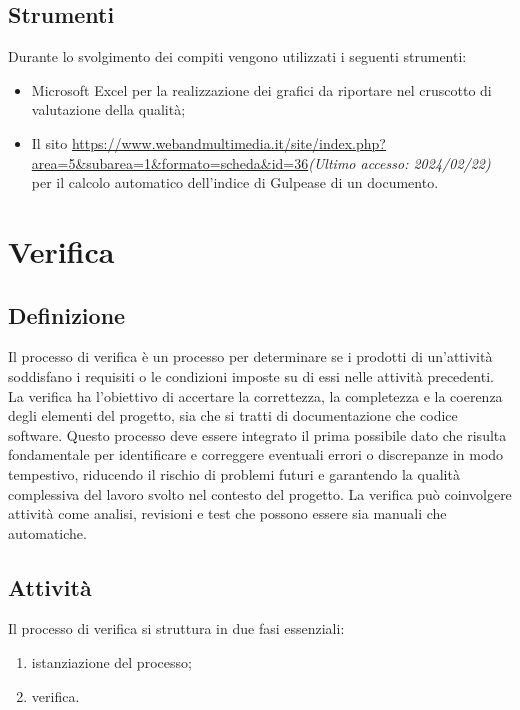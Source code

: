\subsection{Strumenti}
Durante lo svolgimento dei compiti vengono utilizzati i seguenti strumenti:
\begin{itemize}
    \item Microsoft Excel per la realizzazione dei grafici da riportare nel cruscotto di valutazione della qualità;
    \item Il sito \url{https://www.webandmultimedia.it/site/index.php?area=5&subarea=1&formato=scheda&id=36}\textit{(Ultimo accesso: 2024/02/22)} per il calcolo automatico dell'indice di Gulpease di un documento.
\end{itemize}
\newpage


\section{Verifica} \label{sec:verifica}
\subsection{Definizione}
Il processo di verifica è un processo per determinare se i prodotti di un'attività soddisfano i requisiti o le condizioni imposte su di essi nelle attività precedenti. La verifica ha l'obiettivo di accertare la correttezza, la completezza e la coerenza degli elementi del progetto, sia che si tratti di documentazione che codice software. Questo processo deve essere integrato il prima possibile dato che risulta fondamentale per identificare e correggere eventuali errori o discrepanze in modo tempestivo, riducendo il rischio di problemi futuri e garantendo la qualità complessiva del lavoro svolto nel contesto del progetto. La verifica può coinvolgere attività come analisi, revisioni e test che possono essere sia manuali che automatiche.

\subsection{Attività}
Il processo di verifica si struttura in due fasi essenziali:

\begin{enumerate}
    \item istanziazione del processo;
    \item verifica. 
    
\end{enumerate}
